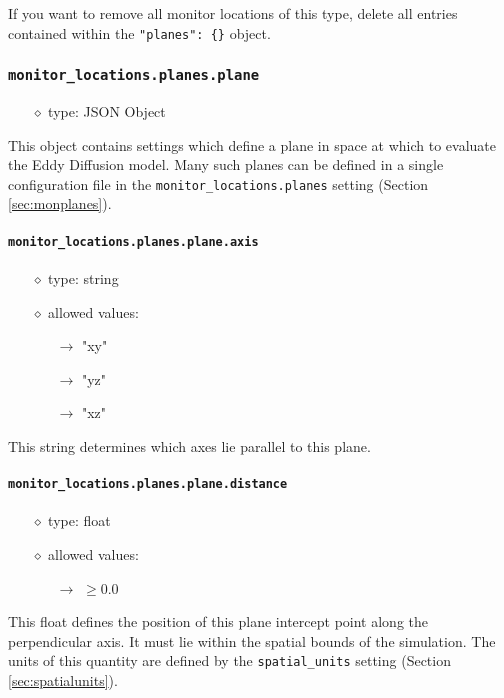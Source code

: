 \documentclass[]{article}
\def\code#1{\texttt{#1}}
\begin{document}
\noindent If you want to remove all monitor locations of this type, delete all
entries contained within the \code{"planes": \{\}} object.

\subsubsection{\code{monitor\_locations.planes.plane}}
\begin{itemize}
    \item[$\diamond$] type: JSON Object 
\end{itemize}
This object contains settings which define a plane in space at which to evaluate
the Eddy Diffusion model. Many such planes can be defined in a single
configuration file in the \code{monitor\_locations.planes} setting (Section
\ref{sec:monplanes}).

\paragraph{\code{monitor\_locations.planes.plane.axis}}
\begin{itemize}
    \item[$\diamond$] type: string 
    \item[$\diamond$] allowed values:
    \begin{itemize}
        \item[$\rightarrow$] "xy"
        \item[$\rightarrow$] "yz"
        \item[$\rightarrow$] "xz"
    \end{itemize}
\end{itemize}
This string determines which axes lie parallel to this plane.

\paragraph{\code{monitor\_locations.planes.plane.distance}}
\begin{itemize}
    \item[$\diamond$] type: float 
    \item[$\diamond$] allowed values:
    \begin{itemize}
        \item[$\rightarrow$] $\geq0.0$ 
    \end{itemize}
\end{itemize}
This float defines the position of this plane intercept point along the
perpendicular axis. It must lie within the spatial bounds of the simulation. The
units of this quantity are defined by the \code{spatial\_units} setting (Section
\ref{sec:spatialunits}).
\end{document}
